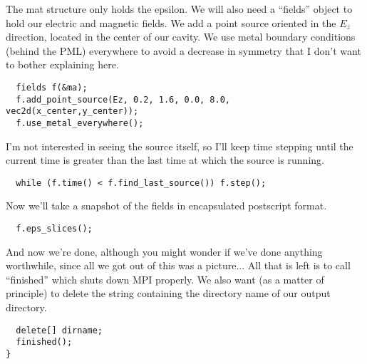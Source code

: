 The mat structure only holds the epsilon.  We will also need a ``fields''
object to hold our electric and magnetic fields.  We add a point source
oriented in the $E_z$ direction, located in the center of our cavity.  We
use metal boundary conditions (behind the PML) everywhere to avoid a
decrease in symmetry that I don't want to bother explaining here.
\begin{verbatim}
  fields f(&ma);
  f.add_point_source(Ez, 0.2, 1.6, 0.0, 8.0, vec2d(x_center,y_center));
  f.use_metal_everywhere();
\end{verbatim}
I'm not interested in seeing the source itself, so I'll keep time stepping
until the current time is greater than the last time at which the source is
running.
\begin{verbatim}
  while (f.time() < f.find_last_source()) f.step();
\end{verbatim}
Now we'll take a snapshot of the fields in encapsulated postscript format.
\begin{verbatim}
  f.eps_slices();
\end{verbatim}
And now we're done, although you might wonder if we've done anything
worthwhile, since all we got out of this was a picture... All that is left
is to call ``finished'' which shuts down MPI properly.  We also want (as a
matter of principle) to delete the string containing the directory name of
our output directory.
\begin{verbatim}
  delete[] dirname;
  finished();
}
\end{verbatim}
